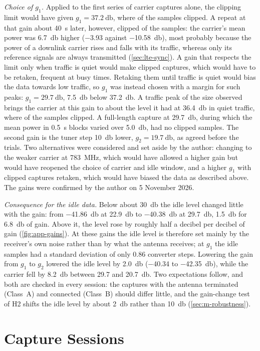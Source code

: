 \emph{Choice of $g_1$.} Applied to the first series of carrier captures alone, the clipping limit would have given $g_1 = \qty{37.2}{\decibel}$, where  of the samples clipped. A repeat at that gain about \qty{40}{\second} later, however, clipped  of the samples: the carrier's mean power was \qty{6.7}{\decibel} higher (\qty{-3.93}{} against \qty{-10.58}{\decibel}), most probably because the power of a downlink carrier rises and falls with its traffic, whereas only its reference signals are always transmitted (\cref{sec:lte-sync}). A gain that respects the limit only when traffic is quiet would make clipped captures, which would have to be retaken, frequent at busy times. Retaking them until traffic is quiet would bias the data towards low traffic, so $g_1$ was instead chosen with a margin for such peaks: $g_1 = \qty{29.7}{\decibel}$, \qty{7.5}{\decibel} below \qty{37.2}{\decibel}. A traffic peak of the size observed brings the carrier at this gain to about the level it had at \qty{36.4}{\decibel} in quiet traffic, where  of the samples clipped. A full-length capture at \qty{29.7}{\decibel}, during which the mean power in \qty{0.5}{\second} blocks varied over \qty{5.0}{\decibel}, had no clipped samples. The second gain is the tuner step \qty{10}{\decibel} lower, $g_2 = \qty{19.7}{\decibel}$, as agreed before the trials. Two alternatives were considered and set aside by the author: changing to the weaker carrier at \qty{783}{\mega\hertz}, which would have allowed a higher gain but would have reopened the choice of carrier and idle window, and a higher $g_1$ with clipped captures retaken, which would have biased the data as described above. The gains were confirmed by the author on 5 November 2026.

\emph{Consequence for the idle data.} Below about \qty{30}{\decibel} the idle level changed little with the gain: from \qty{-41.86}{\decibel} at \qty{22.9}{\decibel} to \qty{-40.38}{\decibel} at \qty{29.7}{\decibel}, \qty{1.5}{\decibel} for \qty{6.8}{\decibel} of gain. Above it, the level rose by roughly half a decibel per decibel of gain (\cref{fig:app-gains}). At these gains the idle level is therefore set mainly by the receiver's own noise rather than by what the antenna receives; at $g_1$ the idle samples had a standard deviation of only \num{0.86} converter steps. Lowering the gain from $g_1$ to $g_2$ lowered the idle level by \qty{2.0}{\decibel} (\qty{-40.34}{} to \qty{-42.35}{\decibel}), while the carrier fell by \qty{8.2}{\decibel} between \qty{29.7}{} and \qty{20.7}{\decibel}. Two expectations follow, and both are checked in every session: the captures with the antenna terminated (Class~A) and connected (Class~B) should differ little, and the gain-change test of H2 shifts the idle level by about \qty{2}{\decibel} rather than \qty{10}{\decibel} (\cref{sec:m-robustness}).

\section{Capture Sessions}
\label{app:sessions}

